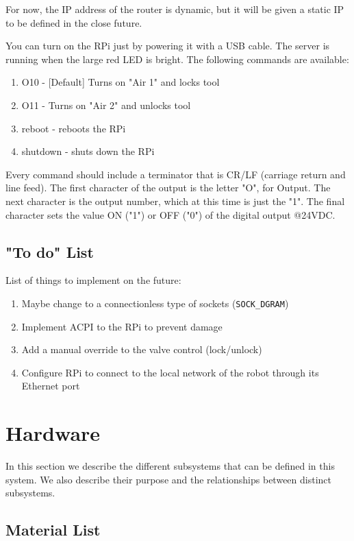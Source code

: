 \documentclass[twoside,a4paper]{refart}
\begin{document}
\attention For now, the IP address of the router is dynamic, but it will be given a static IP to be defined in the close future.

You can turn on the RPi just by powering it with a \mu USB cable. The server is running when the large red LED is bright. The following commands are available:
\begin{enumerate}
	\item
	O10 - [Default] Turns on "Air 1" and locks tool
	\item
	O11 - Turns on "Air 2" and unlocks tool
	\item
	reboot - reboots the RPi
	\item
	shutdown - shuts down the RPi
\end{enumerate}
Every command should include a terminator that is CR/LF (carriage return and line feed). The first character of the output is the letter "O", for Output. The next character is the output number, which at this time is just the "1". The final character sets the value ON ("1") or OFF ("0") of the digital output @24VDC. 

\subsection{"To do" List}
List of things to implement on the future:
\begin{enumerate}
	\item
	 Maybe change to a connectionless type of sockets ({\tt SOCK\_DGRAM})
	\item
	 Implement ACPI to the RPi to prevent damage
	\item
	 Add a manual override to the valve control (lock/unlock)
	\item
	 Configure RPi to connect to the local network of the robot through its Ethernet port
\end{enumerate}

\section{Hardware}
In this section we describe the different subsystems that can be defined in this system. We also describe their purpose and the relationships between distinct subsystems.

\subsection{Material List}
\end{document}
